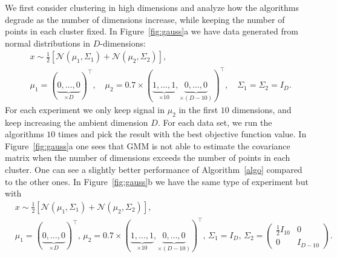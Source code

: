 \documentclass[aps,preprint,nofootinbib,floatfix]{revtex4-1}
\begin{document}
We first consider clustering in high dimensions and analyze 
how the algorithms degrade as the number of dimensions increase, while
keeping the number of points in each cluster fixed. 
In Figure~\ref{fig:gauss}a we have data generated from normal 
distributions in 
$D$-dimensions:
\begin{equation}
\label{eq:gauss1}
\begin{split}
&x \sim \tfrac{1}{2}\left[ 
\mathcal{N}(\mu_1,\Sigma_1) + \mathcal{N}(\mu_2, \Sigma_2)\right], \\
&\mu_1 = (\underbrace{0,\dotsc,0}_{\times D})^\top , \quad
\mu_2 = 0.7 \times (\underbrace{1,\dots,1}_{\times 10},
\underbrace{0,\dots,0}_{\times (D-10)})^\top, \quad
\Sigma_1 = \Sigma_2 = I_D.
\end{split}
\end{equation}
For each experiment we only keep signal in
$\mu_2$ in the first $10$
dimensions, and keep increasing the ambient dimension $D$. For each
data set, we run the algorithms $10$ times and pick the result with
the best objective function value.
In Figure~\ref{fig:gauss}a one sees that
GMM is not able to estimate the covariance matrix 
when the number
of dimensions exceeds the number of points in each cluster. 
One can see a slightly better performance of Algorithm~\ref{algo} compared
to the other ones.
In Figure~\ref{fig:gauss}b we have the same type of experiment but 
with 
\begin{equation}
\label{eq:gauss2}
\begin{split}
&x \sim \tfrac{1}{2}\left[ 
\mathcal{N}(\mu_1,\Sigma_1) + \mathcal{N}(\mu_2, \Sigma_2)\right], \\
&\mu_1 = (\underbrace{0,\dotsc,0}_{\times D})^\top , \,
\mu_2 = 0.7 \times (\underbrace{1,\dots,1}_{\times 10},
\underbrace{0,\dots,0}_{\times (D-10)})^\top, \,
\Sigma_1 = I_D, \, 
\Sigma_2 = \left( \begin{smallmatrix} \tfrac{1}{2} I_{10} & 0 \\ 0 & I_{D-10}
\end{smallmatrix}\right). \quad
\end{split}
\end{equation}
\end{document}

